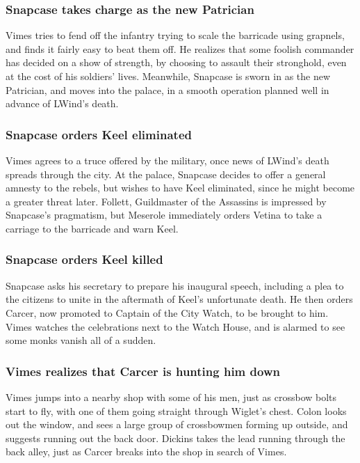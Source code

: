 \subsubsection{\Gls{Snapcase} takes charge as the new Patrician}
\Gls{Vimes} tries to fend off the infantry trying to scale the barricade using grapnels, and finds
it fairly easy to beat them off. He realizes that some foolish commander has decided on a show of
strength, by choosing to assault their stronghold, even at the cost of his soldiers' lives.
Meanwhile, \Gls{Snapcase} is sworn in as the new Patrician, and moves into the palace, in a smooth
operation planned well in advance of \Gls{LWind}'s death.

\subsubsection{\Gls{Snapcase} orders \Gls{Keel} eliminated}
\Gls{Vimes} agrees to a truce offered by the military, once news of \Gls{LWind}'s death spreads
through the city. At the palace, \Gls{Snapcase} decides to offer a general amnesty to the rebels,
but wishes to have \Gls{Keel} eliminated, since he might become a greater threat later.
\Gls{Follett}, Guildmaster of the Assassins is impressed by \Gls{Snapcase}'s pragmatism, but
\Gls{Meserole} immediately orders \Gls{Vetina} to take a carriage to the barricade and warn
\Gls{Keel}.

\subsubsection{\Gls{Snapcase} orders \Gls{Keel} killed}
\Gls{Snapcase} asks his secretary to prepare his inaugural speech, including a plea to the citizens
to unite in the aftermath of \Gls{Keel}'s unfortunate death. He then orders \Gls{Carcer}, now
promoted to Captain of the City Watch, to be brought to him. \Gls{Vimes} watches the celebrations
next to the Watch House, and is alarmed to see some monks vanish all of a sudden.

\subsubsection{\Gls{Vimes} realizes that \Gls{Carcer} is hunting him down}
\Gls{Vimes} jumps into a nearby shop with some of his men, just as crossbow bolts start to fly,
with one of them going straight through \Gls{Wiglet}'s chest. \Gls{Colon} looks out the window, and
sees a large group of crossbowmen forming up outside, and suggests running out the back door.
\Gls{Dickins} takes the lead running through the back alley, just as \Gls{Carcer} breaks into the
shop in search of \Gls{Vimes}.

